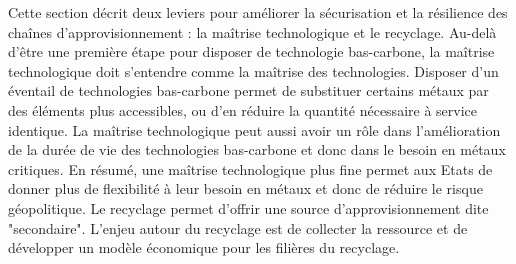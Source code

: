 Cette section décrit deux leviers pour améliorer la sécurisation et la résilience des chaînes d'approvisionnement : la maîtrise technologique et le recyclage.\smallbreak
Au-delà d'être une première étape pour disposer de technologie bas-carbone, la maîtrise technologique doit s'entendre comme la maîtrise des technologies. Disposer d'un éventail de technologies bas-carbone permet de substituer certains métaux par des éléments plus accessibles, ou d'en réduire la quantité nécessaire à service identique. La maîtrise technologique peut aussi avoir un rôle dans l'amélioration de la durée de vie des technologies bas-carbone et donc dans le besoin en métaux critiques. En résumé, une maîtrise technologique plus fine permet aux Etats de donner plus de flexibilité à leur besoin en métaux et donc de réduire le risque géopolitique.\smallbreak
Le recyclage permet d'offrir une source d'approvisionnement dite "secondaire". L'enjeu autour du recyclage est de collecter la ressource et de développer un modèle économique pour les filières du recyclage.
